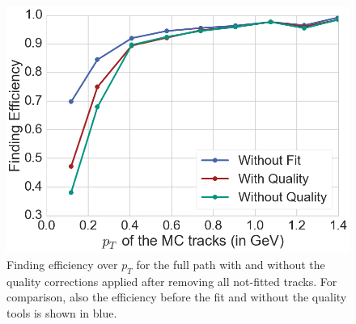 \begin{figure}
  \centering
  \includegraphics[width=0.7\linewidth]{figures/workflow/efficiency_after_fit.png}
  \caption{Finding efficiency over $p_T$ for the full path with and without the quality corrections applied after removing all not-fitted tracks. For comparison, also the efficiency before the fit and without the quality tools is shown in blue.}
  \label{fig-efficiency-after-fitting}
\end{figure}

